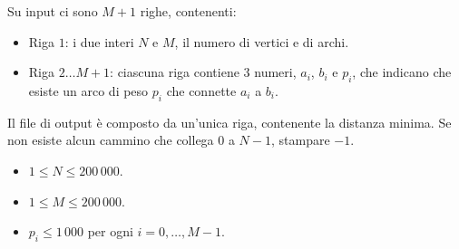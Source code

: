 \Grader
Su input ci sono $M+1$ righe, contenenti:
\begin{itemize}[nolistsep,itemsep=2mm]
\item Riga $1$: i due interi $N$ e $M$, il numero di vertici e di archi.
\item Riga $2\dots M+1$: ciascuna riga contiene $3$ numeri, $a_i$, $b_i$ e $p_i$, che indicano che esiste un arco di peso $p_i$ che connette $a_i$ a $b_i$.

\end{itemize}

Il file di output è composto da un'unica riga, contenente la distanza minima. Se non esiste alcun cammino che collega $0$ a $N-1$, stampare $-1$.



\Constraints

\begin{itemize}[nolistsep, itemsep=2mm]
	\item $1 \le N \le 200\,000$.
    \item $1 \le M \le 200\,000$.
	\item $p_i \le 1\,000$ per ogni $i=0,\ldots, M-1$.
\end{itemize}



\Examples

\begin{example}
%
%
\end{example}



% 

